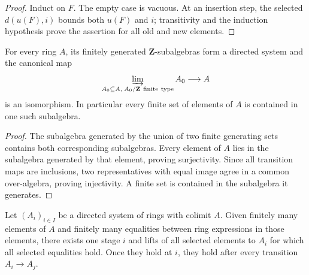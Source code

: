 \begin{proof}
  Induct on $F$.  The empty case is vacuous.  At an insertion step, the
  selected $d(u(F),i)$ bounds both $u(F)$ and $i$; transitivity and the
  induction hypothesis prove the assertion for all old and new elements.
\end{proof}

\begin{lemma}
  \label{lemma:nagata-ring-finite-type-subalgebras}
  \leanok

  For every ring $A$, its finitely generated $\mathbf Z$-subalgebras form a
  directed system and the canonical map
  \[
    \varinjlim_{A_0\subseteq A,\;A_0/\mathbf Z\ \mathrm{finite\ type}}A_0
      \longrightarrow A
  \]
  is an isomorphism.  In particular every finite set of elements of $A$ is
  contained in one such subalgebra.
\end{lemma}

\begin{proof}
  \leanok
  The subalgebra generated by the union of two finite generating sets contains
  both corresponding subalgebras.  Every element of $A$ lies in the
  subalgebra generated by that element, proving surjectivity.  Since all
  transition maps are inclusions, two representatives with equal image agree
  in a common over-algebra, proving injectivity.  A finite set is contained in
  the subalgebra it generates.
\end{proof}

\begin{lemma}
  \label{lemma:nagata-filtered-colimit-finite-data}

  Let $(A_i)_{i\in I}$ be a directed system of rings with colimit $A$.  Given
  finitely many elements of $A$ and finitely many equalities between ring
  expressions in those elements, there exists one stage $i$ and lifts of all
  selected elements to $A_i$ for which all selected equalities hold.  Once
  they hold at $i$, they hold after every transition $A_i\to A_j$.
\end{lemma}

